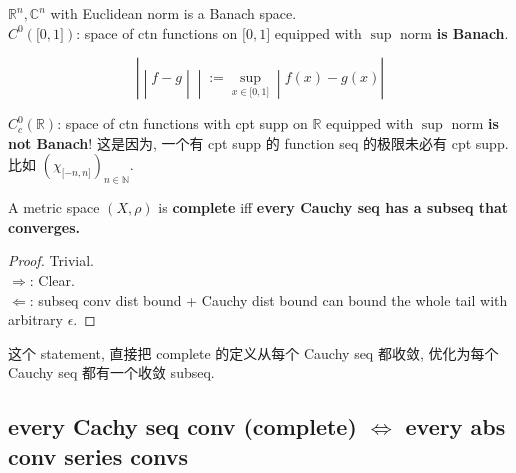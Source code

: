 \documentclass{qlnotes-export}
\begin{document}
\begin{example}

\({\mathbb{R}}^{n},{\mathbb{C}}^{n}\) with Euclidean norm is a Banach space.\\
\(C^{0}(\lbrack 0,1\rbrack)\): space of ctn functions on \(\lbrack 0,1\rbrack\) equipped with \(\sup\) norm \textbf{is Banach}.

\[\left. | \middle| f - g \middle| \middle| := \sup\limits_{x \in \lbrack 0,1\rbrack} \middle| f(x) - g(x)| \right.\]

\(C_{c}^{0}({\mathbb{R}})\): space of ctn functions with cpt supp on \(\mathbb{R}\) equipped with \(\sup\) norm \textbf{is not Banach}! 这是因为, 一个有 cpt supp 的 function seq 的极限未必有 cpt supp. 比如 \((\chi_{\lbrack - n,n\rbrack})_{n \in {\mathbb{N}}}\).

\end{example}

\begin{lemma}

A metric space \((X,\rho)\) is \textbf{complete} iff \textbf{every Cauchy seq has a subseq that converges.}

\end{lemma}

\begin{proof}

Trivial.\\
\(\Longrightarrow\): Clear.\\
\(\Longleftarrow\): subseq conv dist bound + Cauchy dist bound can bound the whole tail with arbitrary \(\epsilon\).

\end{proof}

这个 statement, 直接把 complete 的定义从每个 Cauchy seq 都收敛, 优化为每个 Cauchy seq 都有一个收敛 subseq.

\subsection{\texorpdfstring{every Cachy seq conv (complete) \(\Leftrightarrow\) every abs conv series convs}{every Cachy seq conv (complete) \textbackslash Leftrightarrow every abs conv series convs}}\label{every-cachy-seq-conv-complete-leftrightarrow-every-abs-conv-series-convs}
\end{document}
